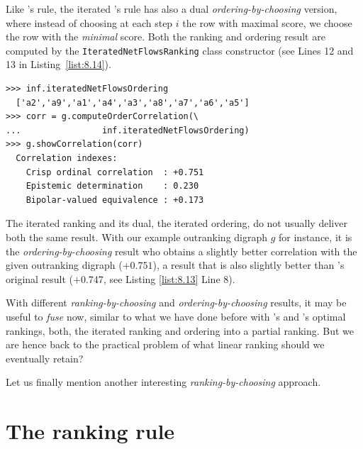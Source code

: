 Like \Kohler 's rule, the iterated \NetFlows 's rule has also a dual \emph{ordering-by-choosing} version, where instead of choosing at each step $i$ the row with maximal \NetFlows score, we choose the row with the \emph{minimal} \NetFlows score. Both the ranking and ordering result are computed by the \texttt{IteratedNetFlowsRanking} class constructor (see Lines 12 and 13 in Listing~\ref{list:8.14}).
\begin{lstlisting}
>>> inf.iteratedNetFlowsOrdering
  ['a2','a9','a1','a4','a3','a8','a7','a6','a5']
>>> corr = g.computeOrderCorrelation(\
...                inf.iteratedNetFlowsOrdering)
>>> g.showCorrelation(corr)
  Correlation indexes:
    Crisp ordinal correlation  : +0.751
    Epistemic determination    : 0.230
    Bipolar-valued equivalence : +0.173
\end{lstlisting}
The iterated \NetFlows ranking and its dual, the iterated \NetFlows ordering, do not usually deliver both the same result. With our example outranking digraph $g$ for instance, it is the \emph{ordering-by-choosing} result who obtains a slightly better correlation with the given outranking digraph ($+0.751$), a result that is also slightly better than \Kohler 's original result ($+0.747$, see Listing \ref{list:8.13} Line 8).

With different \emph{ranking-by-choosing} and \emph{ordering-by-choosing} results, it may be useful to \emph{fuse} now, similar to what we have done before with \Kemeny 's and \Slater 's optimal rankings, both, the iterated \NetFlows ranking and ordering into a partial ranking. But we are hence back to the practical problem of what linear ranking should we eventually retain? 

Let us finally mention another interesting \emph{ranking-by-choosing} approach.

\section{The \RankedPairs ranking rule}
\label{sec:8.7}

